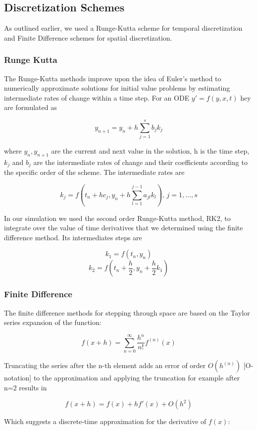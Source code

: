 \documentclass[12pt]{article}
\begin{document}
\subsection{Discretization Schemes}

As outlined earlier, we used a Runge-Kutta scheme for temporal discretization and Finite Difference schemes for spatial discretization.

\subsubsection*{Runge Kutta}

The Runge-Kutta methods improve upon the idea of Euler's method to numerically approximate solutions for initial value problems by estimating intermediate rates of change within a time step. For an ODE $y' = f(y,x,t)$ hey are formulated as

$$y_{n+1} = y_n + h \sum_{j=1}^s b_j k_j$$

where $y_n, y_{n+1}$ are the current and next value in the solution, h is the time step,  $k_j$ and $b_j$ are the intermediate rates of change and their coefficients according to the specific order of the scheme. The intermediate rates are

$$k_j = f\left(t_n + h c_j, y_n + h \sum_{l=1}^{j-1} a_{jl} k_l \right),\,j=1,...,s$$

In our simulation we used the second order Runge-Kutta method, RK2, to integrate over the value of time derivatives that we determined using the finite difference method. Its intermediates steps are

$$k_1 = f(t_n, y_n )$$
$$k_2 = f \left( t_n+\frac{h}{2}, y_n+\frac{h}{2}k_1 \right)$$

\subsubsection*{Finite Difference}
The finite difference methods for stepping through space are based on the Taylor series expansion of the function:

$$f(x+h) = \sum_{n=0}^\infty \frac{h^n}{n!}f^{(n)}(x)$$

Truncating the series after the n-th element adds an error of order $O(h^{(n)})$ [O-notation] to the approximation and applying the truncation for example after n=2 results in 

$$f(x+h)=f(x)+hf'(x)+O(h^2)$$

Which suggests a discrete-time approximation for the derivative of $f(x)$:
\end{document}
